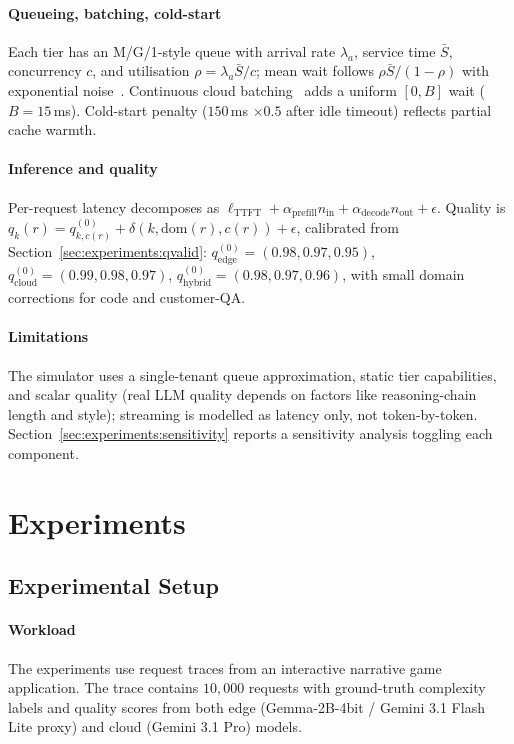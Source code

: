 \documentclass[final,3p,twocolumn,authoryear]{elsarticle}
\theoremstyle{plain}
\theoremstyle{definition}
\begin{document}
\paragraph{Queueing, batching, cold-start}
Each tier has an M/G/1-style queue with arrival rate $\lambda_a$, service time $\bar{S}$, concurrency $c$, and utilisation $\rho{=}\lambda_a\bar{S}/c$; mean wait follows $\rho\bar{S}/(1{-}\rho)$ with exponential noise~\citep{kleinrock1975queueing,gujarati2020serving}. Continuous cloud batching~\citep{yu2022orca,kwon2023vllm} adds a uniform $[0,B]$ wait ($B{=}15$\,ms). Cold-start penalty ($150$\,ms $\times 0.5$ after idle timeout) reflects partial cache warmth.

\paragraph{Inference and quality}
Per-request latency decomposes as $\ell_{\text{TTFT}}+\alpha_{\text{prefill}}n_{\text{in}}+\alpha_{\text{decode}}n_{\text{out}}+\epsilon$. Quality is $q_k(r){=}q^{(0)}_{k,c(r)}+\delta(k,\text{dom}(r),c(r))+\epsilon$, calibrated from Section~\ref{sec:experiments:qvalid}: $q^{(0)}_{\text{edge}}{=}(0.98,0.97,0.95)$, $q^{(0)}_{\text{cloud}}{=}(0.99,0.98,0.97)$, $q^{(0)}_{\text{hybrid}}{=}(0.98,0.97,0.96)$, with small domain corrections for code and customer-QA.

\paragraph{Limitations}
The simulator uses a single-tenant queue approximation, static tier capabilities, and scalar quality (real LLM quality depends on factors like reasoning-chain length and style); streaming is modelled as latency only, not token-by-token. Section~\ref{sec:experiments:sensitivity} reports a sensitivity analysis toggling each component.

\section{Experiments}
\label{sec:experiments}

\subsection{Experimental Setup}

\paragraph{Workload}
The experiments use request traces from an interactive narrative game application.
The trace contains $10{,}000$ requests with ground-truth complexity labels and quality scores from both edge (Gemma-2B-4bit / Gemini 3.1 Flash Lite proxy) and cloud (Gemini 3.1 Pro) models.
\end{document}
